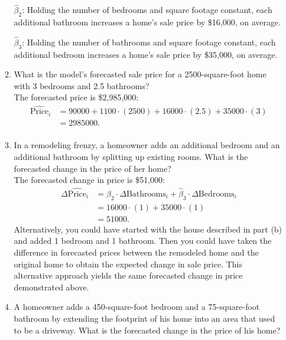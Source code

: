 \documentclass[11pt]{article}
\begin{document}
\begin{onehalfspacing}
\begin{enumerate}
\begin{enumerate}
{		$\hat{\beta}_2$: Holding the number of bedrooms and square footage constant, each additional bathroom increases a home's sale price by \$16,000, on average.
		
		$\hat{\beta}_3$: Holding the number of bathrooms and square footage constant, each additional bedroom increases a home's sale price by \$35,000, on average.\\
	}
	
	\item What is the model's forecasted sale price for a 2500-square-foot home with 3 bedrooms and 2.5 bathrooms?\\
	
		{\color{pine_green} The forecasted price is \$2,985,000:
		\begin{align*}
		\hat{\text{Price}}_i &= 90000 + 1100 \cdot (2500) + 16000 \cdot (2.5) + 35000 \cdot (3) \\
		&= 2985000.\\
		\end{align*}
	}
	
	\item In a remodeling frenzy, a homeowner adds an additional bedroom and an additional bathroom by splitting up existing rooms. What is the forecasted change in the price of her home?\\
	
		{\color{pine_green} The forecasted change in price is \$51,000:
		\begin{align*}
		\Delta\hat{\text{Price}}_i &= \hat{\beta}_2 \cdot \Delta\text{Bathrooms}_i + \hat{\beta}_3 \cdot \Delta\text{Bedrooms}_i \\
		&= 16000 \cdot (1) + 35000 \cdot (1) \\
		&= 51000.
		\end{align*}
		Alternatively, you could have started with the house described in part (b) and added 1 bedroom and 1 bathroom. Then you could have taken the difference in forecasted prices between the remodeled home and the original home to obtain the expected change in sale price. This alternative approach yields the same forecasted change in price demonstrated above.\\
	}
	
	\item A homeowner adds a 450-square-foot bedroom and a 75-square-foot bathroom by extending the footprint of his home into an area that used to be a driveway. What is the forecasted change in the price of his home? \\
	

\end{enumerate}
\end{enumerate}
\end{onehalfspacing}
\end{document}

